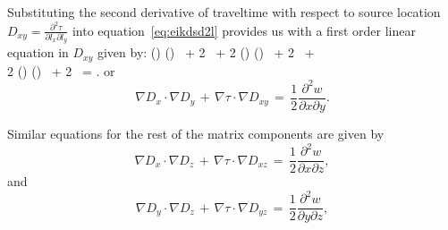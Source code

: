 Substituting the second derivative of traveltime with respect to
source location $D_{xy}=\frac{\partial^2 \tau}{\partial l_x \partial
  l_y}$ into equation~\ref{eq:eikdsd2l} provides us with a first order
linear equation in $D_{xy}$ given by: 
 \left(\right)
\left(\right) \, + 2  \,  + 2
\left(\right) \left(\right) \, +
2  \, + \nonumber \\
2 \left(\right) \left(\right) \, + 2  \,
 = .
\label{eq:eikdsdd2}
\eea
or
\begin{equation}
\nabla D_x \cdot \nabla D_y \, + \,\nabla \tau \cdot \nabla D_{xy} \, = \, \frac{1}{2} \frac{\partial^2 w}{\partial x \partial y}.
\label{eq:eikdssM1}
\end{equation}

Similar equations for the rest of the matrix components are given by
\begin{equation}
\nabla D_x \cdot \nabla D_z \, + \,\nabla \tau \cdot \nabla D_{xz} \, = \, \frac{1}{2} \frac{\partial^2 w}{\partial x \partial z},
\label{eq:eikdssM2}
\end{equation}
and
\begin{equation}
\nabla D_y \cdot \nabla D_z \, + \,\nabla \tau \cdot \nabla D_{yz} \, = \, \frac{1}{2} \frac{\partial^2 w}{\partial y \partial z},
\label{eq:eikdssM3}
\end{equation}


\newpage

%

